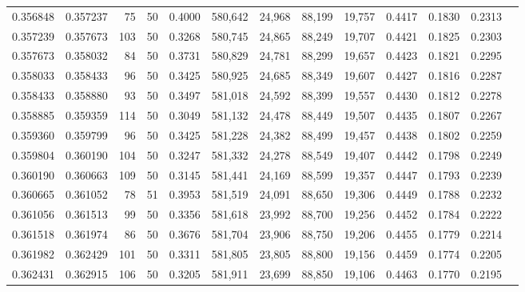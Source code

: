 \begin{tabular}{rrrrrrrrrrrrr}
0.356848 & 0.357237 &    75 &  50 &                                     0.4000 & 580,642 &  24,968 &  88,199 &  19,757 & 0.4417 & 0.1830 & 0.2313 \\
0.357239 & 0.357673 &   103 &  50 &                                     0.3268 & 580,745 &  24,865 &  88,249 &  19,707 & 0.4421 & 0.1825 & 0.2303 \\
0.357673 & 0.358032 &    84 &  50 &                                     0.3731 & 580,829 &  24,781 &  88,299 &  19,657 & 0.4423 & 0.1821 & 0.2295 \\
0.358033 & 0.358433 &    96 &  50 &                                     0.3425 & 580,925 &  24,685 &  88,349 &  19,607 & 0.4427 & 0.1816 & 0.2287 \\
0.358433 & 0.358880 &    93 &  50 &                                     0.3497 & 581,018 &  24,592 &  88,399 &  19,557 & 0.4430 & 0.1812 & 0.2278 \\
0.358885 & 0.359359 &   114 &  50 &                                     0.3049 & 581,132 &  24,478 &  88,449 &  19,507 & 0.4435 & 0.1807 & 0.2267 \\
0.359360 & 0.359799 &    96 &  50 &                                     0.3425 & 581,228 &  24,382 &  88,499 &  19,457 & 0.4438 & 0.1802 & 0.2259 \\
0.359804 & 0.360190 &   104 &  50 &                                     0.3247 & 581,332 &  24,278 &  88,549 &  19,407 & 0.4442 & 0.1798 & 0.2249 \\
0.360190 & 0.360663 &   109 &  50 &                                     0.3145 & 581,441 &  24,169 &  88,599 &  19,357 & 0.4447 & 0.1793 & 0.2239 \\
0.360665 & 0.361052 &    78 &  51 &                                     0.3953 & 581,519 &  24,091 &  88,650 &  19,306 & 0.4449 & 0.1788 & 0.2232 \\
0.361056 & 0.361513 &    99 &  50 &                                     0.3356 & 581,618 &  23,992 &  88,700 &  19,256 & 0.4452 & 0.1784 & 0.2222 \\
0.361518 & 0.361974 &    86 &  50 &                                     0.3676 & 581,704 &  23,906 &  88,750 &  19,206 & 0.4455 & 0.1779 & 0.2214 \\
0.361982 & 0.362429 &   101 &  50 &                                     0.3311 & 581,805 &  23,805 &  88,800 &  19,156 & 0.4459 & 0.1774 & 0.2205 \\
0.362431 & 0.362915 &   106 &  50 &                                     0.3205 & 581,911 &  23,699 &  88,850 &  19,106 & 0.4463 & 0.1770 & 0.2195 \\

\end{tabular}
